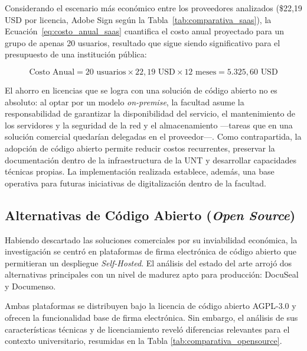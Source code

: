 Considerando el escenario más económico entre los proveedores analizados (\$22,19 USD por licencia, Adobe Sign según la Tabla~\ref{tab:comparativa_saas}), la Ecuación~\eqref{eq:costo_anual_saas} cuantifica el costo anual proyectado para un grupo de apenas 20 usuarios, resultado que sigue siendo significativo para el presupuesto de una institución pública:

\begin{equation}
    \label{eq:costo_anual_saas}
    \text{Costo Anual} = 20 \text{ usuarios} \times 22{,}19 \text{ USD} \times 12 \text{ meses} = 5.325{,}60 \text{ USD}
\end{equation}

El ahorro en licencias que se logra con una solución de código abierto no es absoluto: al optar por un modelo \textit{on-premise}, la facultad asume la responsabilidad de garantizar la disponibilidad del servicio, el mantenimiento de los servidores y la seguridad de la red y el almacenamiento ---tareas que en una solución comercial quedarían delegadas en el proveedor---. Como contrapartida, la adopción de código abierto permite reducir costos recurrentes, preservar la documentación dentro de la infraestructura de la UNT y desarrollar capacidades técnicas propias. La implementación realizada establece, además, una base operativa para futuras iniciativas de digitalización dentro de la facultad.

\subsection{Alternativas de Código Abierto (\textit{Open Source})}
\label{subsec:alternativas_opensource}

Habiendo descartado las soluciones comerciales por su inviabilidad económica, la investigación se centró en plataformas de firma electrónica de código abierto que permitieran un despliegue \textit{Self-Hosted}. El análisis del estado del arte arrojó dos alternativas principales con un nivel de madurez apto para producción: DocuSeal y Documenso.

Ambas plataformas se distribuyen bajo la licencia de código abierto AGPL-3.0 y ofrecen la funcionalidad base de firma electrónica. Sin embargo, el análisis de sus características técnicas y de licenciamiento reveló diferencias relevantes para el contexto universitario, resumidas en la Tabla \ref{tab:comparativa_opensource}.

